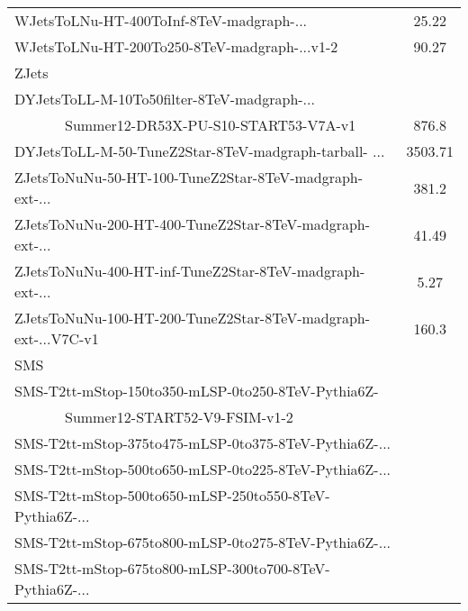 \begin{table}[!htb]
\begin{center}
\begin{tabular}{|l|c|}
WJetsToLNu-HT-400ToInf-8TeV-madgraph-...                                       & 25.22 \\
WJetsToLNu-HT-200To250-8TeV-madgraph-...v1-2                                   & 90.27 \\\hline
ZJets & \\\hline
DYJetsToLL-M-10To50filter-8TeV-madgraph-... & \\
~~~~~~~Summer12-DR53X-PU-S10-START53-V7A-v1             & 876.8\\
DYJetsToLL-M-50-TuneZ2Star-8TeV-madgraph-tarball-  ...              & 3503.71\\
ZJetsToNuNu-50-HT-100-TuneZ2Star-8TeV-madgraph-ext-...              & 381.2\\
ZJetsToNuNu-200-HT-400-TuneZ2Star-8TeV-madgraph-ext-...             & 41.49\\
ZJetsToNuNu-400-HT-inf-TuneZ2Star-8TeV-madgraph-ext-...             & 5.27\\
ZJetsToNuNu-100-HT-200-TuneZ2Star-8TeV-madgraph-ext-...V7C-v1          & 160.3\\\hline
SMS & \\\hline
SMS-T2tt-mStop-150to350-mLSP-0to250-8TeV-Pythia6Z- & \\
~~~~~~~Summer12-START52-V9-FSIM-v1-2          &  \\
SMS-T2tt-mStop-375to475-mLSP-0to375-8TeV-Pythia6Z-...          &  \\
SMS-T2tt-mStop-500to650-mLSP-0to225-8TeV-Pythia6Z-...          &  \\
SMS-T2tt-mStop-500to650-mLSP-250to550-8TeV-Pythia6Z-...        &  \\
SMS-T2tt-mStop-675to800-mLSP-0to275-8TeV-Pythia6Z-...          &  \\
SMS-T2tt-mStop-675to800-mLSP-300to700-8TeV-Pythia6Z-...        &  \\
\hline
\end{tabular}
\end{center}
\end{table}
